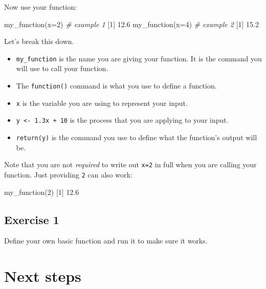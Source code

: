 \documentclass[
]{book}
\newenvironment{Shaded}{\begin{snugshade}}{\end{snugshade}}
\newcommand{\AttributeTok}[1]{\textcolor[rgb]{0.77,0.63,0.00}{#1}}
\newcommand{\CommentTok}[1]{\textcolor[rgb]{0.56,0.35,0.01}{\textit{#1}}}
\newcommand{\DecValTok}[1]{\textcolor[rgb]{0.00,0.00,0.81}{#1}}
\newcommand{\FloatTok}[1]{\textcolor[rgb]{0.00,0.00,0.81}{#1}}
\newcommand{\FunctionTok}[1]{\textcolor[rgb]{0.00,0.00,0.00}{#1}}
\newcommand{\NormalTok}[1]{#1}
\providecommand{\tightlist}{%
  \setlength{\itemsep}{0pt}\setlength{\parskip}{0pt}}
\begin{document}
Now use your function:

\begin{Shaded}
\begin{Highlighting}[]
\FunctionTok{my\_function}\NormalTok{(}\AttributeTok{x=}\DecValTok{2}\NormalTok{) }\CommentTok{\# example 1}
\NormalTok{[}\DecValTok{1}\NormalTok{] }\FloatTok{12.6}
\FunctionTok{my\_function}\NormalTok{(}\AttributeTok{x=}\DecValTok{4}\NormalTok{) }\CommentTok{\# example 2}
\NormalTok{[}\DecValTok{1}\NormalTok{] }\FloatTok{15.2}
\end{Highlighting}
\end{Shaded}

Let's break this down.

\begin{itemize}
\tightlist
\item
  \texttt{my\_function} is the name you are giving your function. It is the command you will use to call your function.
\item
  The \texttt{function()} command is what you use to define a function.
\item
  \texttt{x} is the variable you are using to represent your input.
\item
  \texttt{y\ \textless{}-\ 1.3x\ +\ 10} is the process that you are applying to your input.
\item
  \texttt{return(y)} is the command you use to define what the function's output will be.
\end{itemize}

Note that you are not \emph{required} to write out \texttt{x=2} in full when you are calling your function. Just providing \texttt{2} can also work:

\begin{Shaded}
\begin{Highlighting}[]
\FunctionTok{my\_function}\NormalTok{(}\DecValTok{2}\NormalTok{)}
\NormalTok{[}\DecValTok{1}\NormalTok{] }\FloatTok{12.6}
\end{Highlighting}
\end{Shaded}

\hypertarget{exercise-1-5}{%
\subsection*{Exercise 1}\label{exercise-1-5}}

Define your own basic function and run it to make sure it works.

\hypertarget{next-steps}{%
\section*{Next steps}\label{next-steps}}
\end{document}
